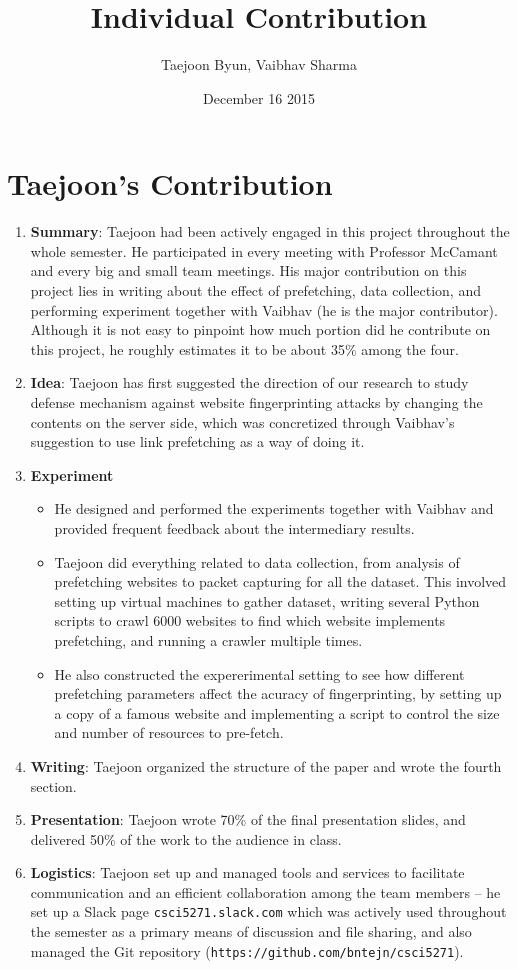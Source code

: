 \documentclass{article}
\title{Individual Contribution}
\author{Taejoon Byun, Vaibhav Sharma}
\date{December 16 2015}
\begin{document}
\section{Taejoon's Contribution}
\begin{enumerate}
\item
{\bf Summary}:
Taejoon had been actively engaged in this project throughout the whole semester.
He participated in every meeting with Professor McCamant and every big and small team meetings.
His major contribution on this project lies in writing about the effect of prefetching, data collection, and performing experiment together with Vaibhav (he is the major contributor).
Although it is not easy to pinpoint how much portion did he contribute on this project, he roughly estimates it to be about 35\% among the four.
\item
{\bf Idea}: Taejoon has first suggested the direction of our research to study defense mechanism against website fingerprinting attacks by changing the contents on the server side, which was concretized through Vaibhav's suggestion to use link prefetching as a way of doing it.
\item
{\bf Experiment}
\begin{itemize}
\item
He designed and performed the experiments together with Vaibhav and provided frequent feedback about the intermediary results.
\item
Taejoon did everything related to data collection, from analysis of prefetching websites to packet capturing for all the dataset.
This involved setting up virtual machines to gather dataset, writing several Python scripts to crawl 6000 websites to find which website implements prefetching, and running a crawler multiple times.
\item
He also constructed the expererimental setting to see how different prefetching parameters affect the acuracy of fingerprinting, by setting up a copy of a famous website and implementing a script to control the size and number of resources to pre-fetch.
\end{itemize}
\item
{\bf Writing}: Taejoon organized the structure of the paper and wrote the fourth section.
\item
{\bf Presentation}: Taejoon wrote 70\% of the final presentation slides, and delivered 50\% of the work to the audience in class.
\item
{\bf Logistics}: Taejoon set up and managed tools and services to facilitate communication and an efficient collaboration among the team members -- he set up a Slack page {\tt csci5271.slack.com} which was actively used throughout the semester as a primary means of discussion and file sharing, and also managed the Git repository ({\tt https://github.com/bntejn/csci5271}).

\end{enumerate}
\end{document}
